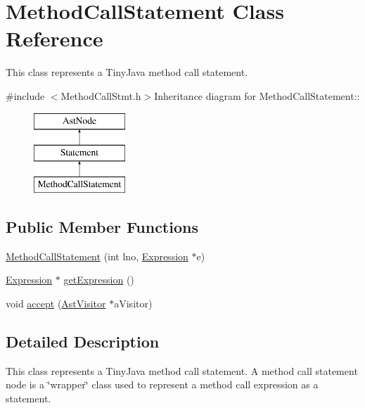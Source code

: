 \hypertarget{classMethodCallStatement}{
\section{MethodCallStatement Class Reference}
\label{classMethodCallStatement}
}


This class represents a TinyJava method call statement.  


{\ttfamily \#include $<$MethodCallStmt.h$>$}Inheritance diagram for MethodCallStatement::\begin{figure}[H]
\begin{center}
\leavevmode
\includegraphics[height=3cm]{classMethodCallStatement}
\end{center}
\end{figure}
\subsection*{Public Member Functions}
\begin{DoxyCompactItemize}
\item 
\hyperlink{classMethodCallStatement_aa0ebf89fb7b2a464aed2685070578279}{MethodCallStatement} (int lno, \hyperlink{classExpression}{Expression} $\ast$e)
\item 
\hyperlink{classExpression}{Expression} $\ast$ \hyperlink{classMethodCallStatement_ab19af10f9dd979693f1714baf6f6e10f}{getExpression} ()
\item 
void \hyperlink{classMethodCallStatement_a4bbae8f172868a47ba651f436087e16f}{accept} (\hyperlink{classAstVisitor}{AstVisitor} $\ast$aVisitor)
\end{DoxyCompactItemize}


\subsection{Detailed Description}
This class represents a TinyJava method call statement. A method call statement node is a \char`\"{}wrapper\char`\"{} class used to represent a method call expression as a statement. 

